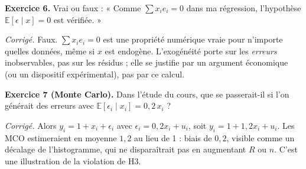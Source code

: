 \documentclass[11pt,a4paper]{article}
\newcommand{\E}{\mathbb{E}}
\begin{document}
\medskip
\textbf{Exercice 6.} Vrai ou faux : « Comme $\sum x_ie_i=0$ dans ma régression, l'hypothèse $\E[\epsilon\mid x]=0$ est vérifiée. »

\emph{Corrigé.} Faux. $\sum x_ie_i=0$ est une propriété numérique vraie pour n'importe quelles données, même si $x$ est endogène. L'exogénéité porte sur les \emph{erreurs} inobservables, pas sur les résidus ; elle se justifie par un argument économique (ou un dispositif expérimental), pas par ce calcul.

\medskip
\textbf{Exercice 7 (Monte Carlo).} Dans l'étude du cours, que se passerait-il si l'on générait des erreurs avec $\E[\epsilon_i\mid x_i]=0{,}2\,x_i$ ?

\emph{Corrigé.} Alors $y_i=1+x_i+\epsilon_i$ avec $\epsilon_i=0{,}2x_i+u_i$, soit $y_i=1+1{,}2x_i+u_i$. Les MCO estimeraient en moyenne $1{,}2$ au lieu de 1 : biais de $0{,}2$, visible comme un décalage de l'histogramme, qui ne disparaîtrait pas en augmentant $R$ ou $n$. C'est une illustration de la violation de H3.

\end{document}

